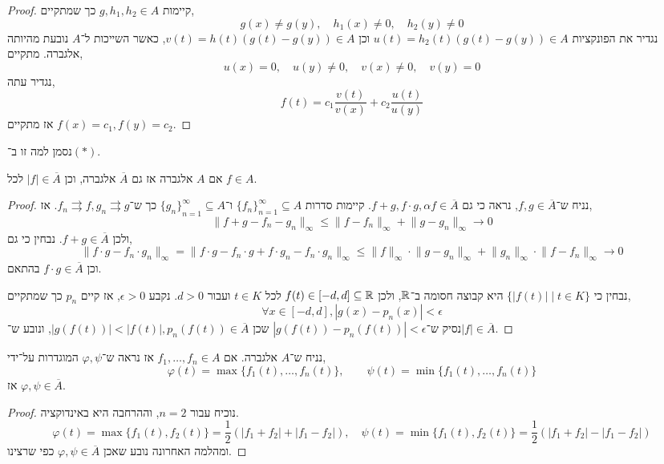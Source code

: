 \begin{proof}
	קיימות $g, h_1, h_2 \in A$ כך שמתקיים,
	\[
		g(x) \ne g(y),
		\quad h_1(x) \ne 0,
		\quad h_2(y) \ne 0
	\]
	נגדיר את הפונקציות $u(t) = h_2(t) (g(t) - g(y)) \in A$ וכן $v(t) = h(t) (g(t) - g(y)) \in A$, כאשר השייכות ל־$A$ נובעת מהיותה אלגברה.
	מתקיים,
	\[
		u(x) = 0,
		\quad u(y) \ne 0,
		\quad v(x) \ne 0,
		\quad v(y) = 0
	\]
	נגדיר עתה,
	\[
		f(t) = c_1 \frac{v(t)}{v(x)} + c_2 \frac{u(t)}{u(y)}
	\]
	אז מתקיים $f(x) = c_1, f(y) = c_2$.
\end{proof}
נסמן למה זו ב־$(*)$.
\begin{lemma}
	אם $A$ אלגברה אז גם $\overline{A}$ אלגברה,
	וכן $|f| \in \overline{A}$ לכל $f \in A$.
\end{lemma}
\begin{proof}
	נניח ש־$f, g \in \overline{A}$, נראה כי גם $f + g, f \cdot g, \alpha f \in \overline{A}$.
	קיימות סדרות ${\{ f_n \}}_{n = 1}^\infty \subseteq A$ ו־${\{ g_n \}}_{n = 1}^\infty \subseteq A$ כך ש־$f_n \rightrightarrows f, g_n \rightrightarrows g$.
	אז,
	\[
		\lVert f + g - f_n - g_n \rVert_\infty
		\le \lVert f - f_n \rVert_\infty + \lVert g - g_n \rVert_\infty \to 0
	\]
	ולכן $f + g \in \overline{A}$.
	נבחין כי גם,
	\[
		\lVert f \cdot g - f_n \cdot g_n \rVert_\infty
		= \lVert f \cdot g - f_n \cdot g + f \cdot g_n - f_n \cdot g_n \rVert_\infty
		\le \lVert f \rVert_\infty \cdot \lVert g - g_n \rVert_\infty + \lVert g_n \rVert_\infty \cdot \lVert f - f_n \rVert_\infty
		\to 0
	\]
	וכן $f \cdot g \in \overline{A}$ בהתאם.

	נבחין כי $\{ |f(t)| \mid t \in K \}$ היא קבוצה חסומה ב־$\mathbb{R}$, ולכן $f(t) \in [-d, d] \subseteq \mathbb{R}$ לכל $t \in K$ ועבור $d > 0$.
	נקבע $\epsilon > 0$, אז קיים $p_n$ כך שמתקיים,
	\[
		\forall x \in [-d, d],
		|g(x) - p_n(x)| < \epsilon
	\]
	נסיק ש־$|g(f(t)) - p_n(f(t))| < \epsilon$ שכן $|g(f(t))| < |f(t)|, p_n(f(t)) \in \overline{A}$, ונובע ש־$|f| \in \overline{A}$.
\end{proof}
\begin{lemma}
	נניח ש־$A$ אלגברה.
	אם $f_1, \ldots, f_n \in A$ אז נראה ש־$\varphi, \psi$ המוגדרות על־ידי,
	\[
		\varphi(t) = \max\{ f_1(t), \ldots, f_n(t) \},
		\qquad
		\psi(t) = \min\{ f_1(t), \ldots, f_n(t) \}
	\]
	אז $\varphi, \psi \in \overline{A}$.
\end{lemma}
\begin{proof}
	נוכיח עבור $n = 2$, וההרחבה היא באינדוקציה.
	\[
		\varphi(t) = \max\{ f_1(t), f_2(t) \} = \frac{1}{2}(|f_1 + f_2| + |f_1 - f_2|),
		\quad
		\psi(t) = \min\{ f_1(t), f_2(t) \} = \frac{1}{2}(|f_1 + f_2| - |f_1 - f_2|)
	\]
	ומהלמה האחרונה נובע שאכן $\varphi, \psi \in \overline{A}$ כפי שרצינו.
\end{proof}
